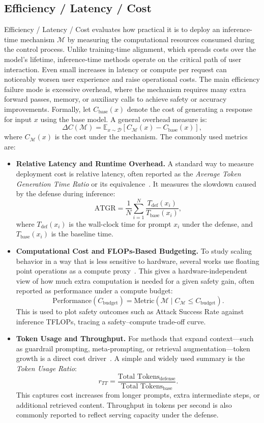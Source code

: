 \subsection{Efficiency / Latency / Cost}
Efficiency / Latency / Cost evaluates how practical it is to deploy an inference-time mechanism $\mathcal{M}$ by measuring the computational resources consumed during the control process. Unlike training-time alignment, which spreads costs over the model's lifetime, inference-time methods operate on the critical path of user interaction. Even small increases in latency or compute per request can noticeably worsen user experience and raise operational costs. The main efficiency failure mode is excessive overhead, where the mechanism requires many extra forward passes, memory, or auxiliary calls to achieve safety or accuracy improvements. Formally, let $C_{\text{base}}(x)$ denote the cost of generating a response for input $x$ using the base model. A general overhead measure is:
\[
\Delta C(\mathcal{M})
=
\mathbb{E}_{x\sim \mathcal{D}}\!\left[ C_{\mathcal{M}}(x) - C_{\text{base}}(x) \right],
\]
where $C_{\mathcal{M}}(x)$ is the cost under the mechanism. The commonly used metrics are:
\begin{itemize}
    \item \textbf{Relative Latency and Runtime Overhead.}
    A standard way to measure deployment cost is relative latency, often reported as the \textit{Average Token Generation Time Ratio} or its equivalence~\citep{Xu2024SafeDecodingDA, Liu2024AlignmentEnhancedDD, Li2024CleanGenMB}. It measures the slowdown caused by the defense during inference:
    \[
    \text{ATGR} = \frac{1}{N} \sum_{i=1}^{N} \frac{T_{\text{def}}(x_i)}{T_{\text{base}}(x_i)},
    \]
    where $T_{\text{def}}(x_i)$ is the wall-clock time for prompt $x_i$ under the defense, and $T_{\text{base}}(x_i)$ is the baseline time.
    \item \textbf{Computational Cost and FLOPs-Based Budgeting.}
    To study scaling behavior in a way that is less sensitive to hardware, several works use floating point operations as a compute proxy~\citep{qiu2025saffron, Lee2025SafeRouteAM}. This gives a hardware-independent view of how much extra computation is needed for a given safety gain, often reported as performance under a compute budget:
    \[
    \text{Performance}(C_{\text{budget}}) = \text{Metric}\!\left(\mathcal{M} \mid C_{\mathcal{M}} \le C_{\text{budget}}\right).
    \]
    This is used to plot safety outcomes such as Attack Success Rate against inference TFLOPs, tracing a safety--compute trade-off curve.
    \item \textbf{Token Usage and Throughput.}
    For methods that expand context---such as guardrail prompting, meta-prompting, or retrieval augmentation---token growth is a direct cost driver~\citep{Jiang2023POSTERIA, shrestha2024fairrag, Zeng2024RootDS}. A simple and widely used summary is the \textit{Token Usage Ratio}:
    \[
    r_{TT} = \frac{\text{Total Tokens}_{\text{defense}}}{\text{Total Tokens}_{\text{base}}}.
    \]
    This captures cost increases from longer prompts, extra intermediate steps, or additional retrieved content. Throughput in tokens per second is also commonly reported to reflect serving capacity under the defense.
\end{itemize}